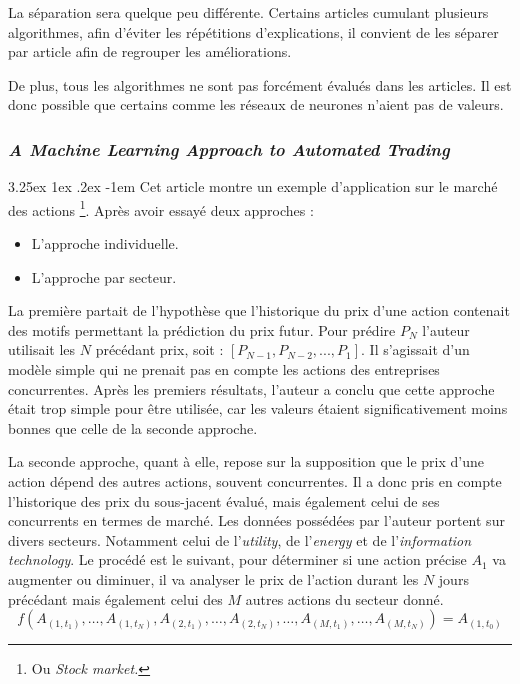 \documentclass[a4paper, 11pt]{article}
\makeatletter
\newcounter{subsubsubsection}[subsubsection]
\renewcommand\paragraph{\@startsection{paragraph}{5}{\z@}%
  {3.25ex \@plus1ex \@minus.2ex}%
  {-1em}%
  {\normalfont\normalsize\bfseries}}
\makeatother
\begin{document}
La séparation sera quelque peu différente. Certains articles cumulant plusieurs algorithmes, afin d'éviter
les répétitions d'explications, il convient de les séparer par article afin de regrouper les améliorations.

De plus, tous les algorithmes ne sont pas forcément évalués dans les articles. Il est donc possible que certains
comme les réseaux de neurones n'aient pas de valeurs.

\subsubsection{\textit{A Machine Learning Approach to Automated Trading}}

\paragraph{}
Cet article montre un exemple d'application sur le marché des actions \cite{machine_learning_automated_trading}
\footnote{Ou \textit{Stock market.}}. Après avoir essayé deux approches :
\begin{itemize}
\item L'approche individuelle.
\item L'approche par secteur.
\end{itemize}

La première partait de l'hypothèse que l'historique du prix d'une action contenait des motifs permettant la prédiction
du prix futur. Pour prédire $P_N$ l'auteur utilisait les $N$ précédant prix, soit : $[P_{N-1}, P_{N-2},...,P_1]$. Il s'agissait d'un modèle simple qui ne prenait pas en compte les actions des entreprises concurrentes.
Après les premiers résultats, l'auteur a conclu que cette approche
était trop simple pour être utilisée, car les valeurs étaient significativement moins bonnes que celle de la
seconde approche\cite{machine_learning_automated_trading}.

La seconde approche, quant à elle, repose sur la supposition que le prix d'une action dépend des autres actions,
souvent concurrentes. Il a donc pris en compte l'historique des prix du sous-jacent évalué, mais également celui de ses
concurrents en termes de marché. Les données possédées par l'auteur portent sur divers secteurs. Notamment celui
de l'\textit{utility}, de l'\textit{energy} et de l'\textit{information technology}. Le procédé est le suivant,
pour déterminer si une action précise $A_1$ va augmenter ou diminuer, il va analyser le prix de l'action durant les $N$ jours
précédant mais également celui des $M$ autres actions du secteur donné.
$$f(A_{(1,t_1)},\dots, A_{(1,t_N)}, A_{(2,t_1)}, \dots, A_{(2,t_N)}, \dots, A_{(M,t_1)},\dots,A_{(M,t_N)}) = A_{(1,t_0)}$$
\end{document}
